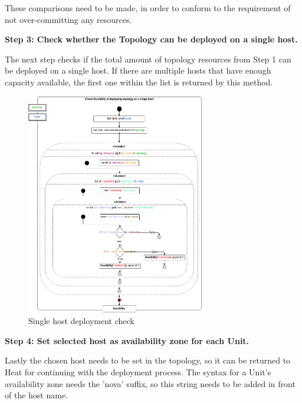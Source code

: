 These comparisons need to be made, in order to conform to the requirement of not over-committing any resources.


\textbf{Step 3: Check whether the Topology can be deployed on a single host.}

The next step checks if the total amount of topology resources from Step 1 can be deployed on a single host. If there are multiple hosts that have enough capacity available, the first one within the list is returned by this method.

\begin{figure}[H]
\centering

\includegraphics[width=0.7\textwidth]{images/implementation/cm_single_host_check}

\caption{Single host deployment check}
\end{figure}


\textbf{Step 4: Set selected host as availability zone for each Unit.}

Lastly the chosen host needs to be set in the topology, so it can be returned to Heat for continuing with the deployment process. The syntax for a Unit's availability zone needs the 'nova' suffix, so this string needs to be added in front of the host name.


